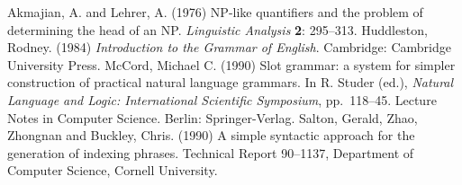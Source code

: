 \documentclass{nle}
\begin{document}
\begin{thebibliography}{}
   Akmajian, A. and Lehrer, A. (1976) NP-like quantifiers and the
   problem of determining the head of an NP. {\it Linguistic
   Analysis\/} {\bf 2}: 295--313.
   Huddleston, Rodney. (1984) {\it Introduction to the Grammar of
   English}. Cambridge: Cambridge University Press.
   McCord, Michael C. (1990) Slot grammar: a system for simpler
   construction of practical natural language grammars. In R.
   Studer (ed.), {\it Natural Language and Logic: International
   Scientific Symposium}, pp.~118--45. Lecture Notes in Computer
   Science. Berlin: Springer-Verlag.
   Salton, Gerald, Zhao, Zhongnan and Buckley, Chris. (1990)
   A simple syntactic approach for the generation of indexing
   phrases. Technical Report 90--1137, Department of Computer
   Science, Cornell University.
\end{thebibliography}

\label{lastpage}
\end{document}

